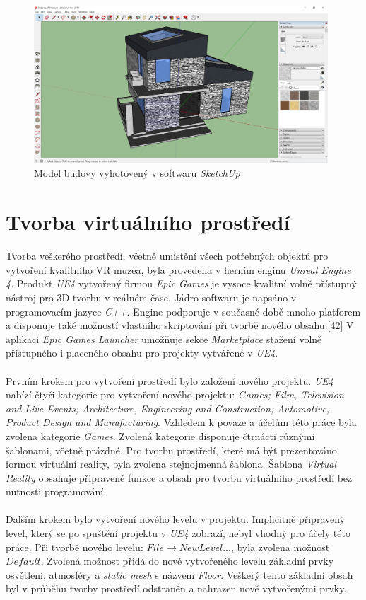 \documentclass[a4paper, 12pt]{report}
\begin{document}
\begin{figure}[h!]
	\centering
	\includegraphics[width=11cm]{budova.jpg}
	\caption{Model budovy vyhotovený v softwaru \textit{SketchUp}}
\end{figure}

\section{Tvorba virtuálního prostředí}
Tvorba veškerého prostředí, včetně umístění všech potřebných objektů pro vytvoření kvalitního VR muzea, byla provedena v herním enginu \textit{Unreal Engine 4}. Produkt \textit{UE4} vytvořený firmou \textit{Epic Games} je vysoce kvalitní volně přístupný nástroj pro 3D tvorbu v reálném čase. Jádro softwaru je napsáno v programovacím jazyce \textit{C++}. Engine podporuje v současné době mnoho platforem a disponuje také možností vlastního skriptování při tvorbě nového obsahu.[42] V aplikaci \textit{Epic Games Launcher} umožňuje sekce \textit{Marketplace} stažení volně přístupného i placeného obsahu pro projekty vytvářené v \textit{UE4}.\\
\\
Prvním krokem pro vytvoření prostředí bylo založení nového projektu. \textit{UE4} nabízí čtyři kategorie pro vytvoření nového projektu: \textit{Games; Film, Television and Live Events; Architecture, Engineering and Construction; Automotive, Product Design and Manufacturing}. Vzhledem k povaze a účelům této práce byla zvolena kategorie \textit{Games}. Zvolená kategorie disponuje čtrnácti různými šablonami, včetně prázdné. Pro tvorbu prostředí, které má být prezentováno formou virtuální reality, byla zvolena stejnojmenná šablona. Šablona \textit{Virtual Reality} obsahuje připravené funkce a obsah pro tvorbu virtuálního prostředí bez nutnosti programování.\\
\\
Dalším krokem bylo vytvoření nového levelu v projektu. Implicitně připravený level, který se po spuštění projektu v \textit{UE4} zobrazí, nebyl vhodný pro účely této práce. Při tvorbě nového levelu: $File \rightarrow New Level...$, byla zvolena možnost $Default$. Zvolená možnost přidá do nově vytvořeného levelu základní prvky osvětlení, atmosféry a \textit{static mesh} s názvem \textit{Floor}. Veškerý tento základní obsah byl v průběhu tvorby prostředí odstraněn a nahrazen nově vytvořenými prvky.
\end{document}
